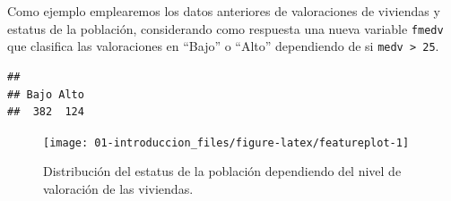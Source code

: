 \documentclass[
]{book}
\newenvironment{Shaded}{\begin{snugshade}}{\end{snugshade}}
\newcommand{\AttributeTok}[1]{\textcolor[rgb]{0.77,0.63,0.00}{#1}}
\newcommand{\CommentTok}[1]{\textcolor[rgb]{0.56,0.35,0.01}{\textit{#1}}}
\newcommand{\ConstantTok}[1]{\textcolor[rgb]{0.00,0.00,0.00}{#1}}
\newcommand{\DecValTok}[1]{\textcolor[rgb]{0.00,0.00,0.81}{#1}}
\newcommand{\FunctionTok}[1]{\textcolor[rgb]{0.00,0.00,0.00}{#1}}
\newcommand{\NormalTok}[1]{#1}
\newcommand{\OtherTok}[1]{\textcolor[rgb]{0.56,0.35,0.01}{#1}}
\newcommand{\SpecialCharTok}[1]{\textcolor[rgb]{0.00,0.00,0.00}{#1}}
\newcommand{\StringTok}[1]{\textcolor[rgb]{0.31,0.60,0.02}{#1}}
\theoremstyle{break}
\theoremstyle{definition}
\theoremstyle{definition}
\theoremstyle{definition}
\theoremstyle{definition}
\theoremstyle{remark}
\begin{document}
Como ejemplo emplearemos los datos anteriores de valoraciones de viviendas y estatus de la población, considerando como respuesta una nueva variable \texttt{fmedv} que clasifica las valoraciones en ``Bajo'' o ``Alto'' dependiendo de si \texttt{medv\ \textgreater{}\ 25}.

\begin{Shaded}
\end{Shaded}

\begin{verbatim}
## 
## Bajo Alto 
##  382  124
\end{verbatim}

\begin{Shaded}
\end{Shaded}

\begin{figure}[!htb]

{\centering \texttt{[image: 01-introduccion\_files/figure-latex/featureplot-1]} 

}

\caption{Distribución del estatus de la población dependiendo del nivel de valoración de las viviendas.}\label{fig:featureplot}
\end{figure}
\end{document}
